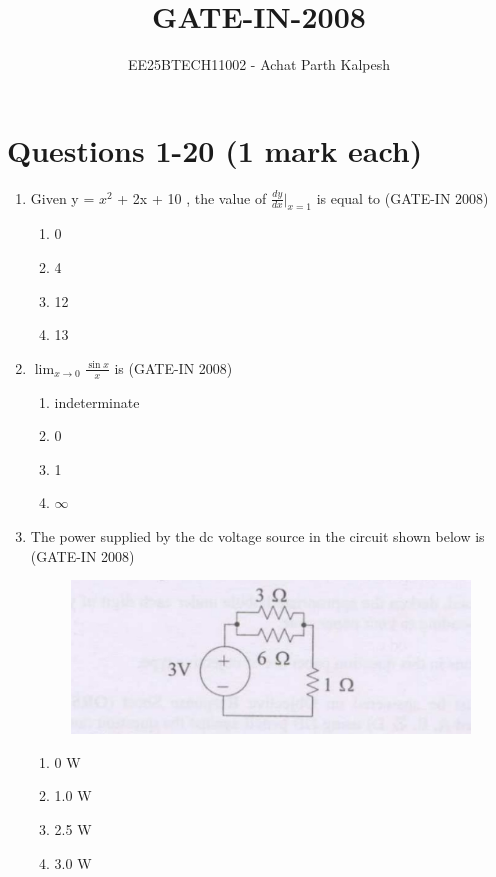 \documentclass[journal,12pt,onecolumn]{IEEEtran}
\title{GATE-IN-2008}
\author{EE25BTECH11002 - Achat Parth Kalpesh }
\date{}
\theoremstyle{remark}
\begin{document}
\maketitle

\section*{Questions 1-20 (1 mark each)}
\begin{enumerate}
    \item Given y = $x^2$ + 2x + 10 , the value of $\frac{dy}{dx}\Big|_{x=1}$ is equal to \hfill{(GATE-IN 2008)}
    \begin{multicols}{4}
    \begin{enumerate} 
        \item 0
        \item 4 
        \item 12 
        \item 13
    \end{enumerate}
    \end{multicols}
    
    \item $\displaystyle \lim_{x \to 0} \frac{\sin x}{x}$ is \hfill{(GATE-IN 2008)}
    \begin{multicols}{4}
    \begin{enumerate} 
        \item indeterminate
        \item  0
        \item  1
        \item $\infty$
    \end{enumerate}
    \end{multicols}
    
    \item  The power supplied by the dc voltage source in the circuit shown below is  \hfill{(GATE-IN 2008)}
    
    \begin{figure}[H]
    \centering
    \includegraphics[width=0.5\columnwidth]{figs/i1.jpg}
    \caption{}
    \label{fig:placeholder1}
\end{figure}
\begin{multicols}{4}
        \begin{enumerate} 
        \item 0 W
        \item 1.0 W
        \item 2.5 W 
        \item 3.0 W
    \end{enumerate}
    \end{multicols}
    

\end{enumerate}
\end{document}
